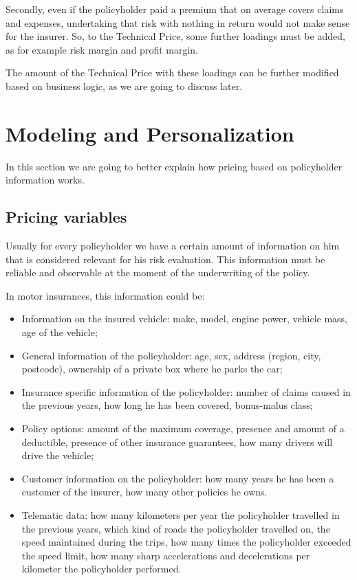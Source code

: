 \documentclass[a4paper, twoside, openright, 12pt]{report}
\providecommand{\tightlist}{%
  \setlength{\itemsep}{0pt}\setlength{\parskip}{0pt}}
\theoremstyle{definition}
\theoremstyle{definition}
\theoremstyle{definition}
\theoremstyle{remark}
\begin{document}
Secondly, even if the policyholder paid a premium that on average covers claims and expenses, undertaking that risk with nothing in return would not make sense for the insurer. So, to the Technical Price, some further loadings must be added, as for example risk margin and profit margin.

The amount of the Technical Price with these loadings can be further modified based on business logic, as we are going to discuss later.

\hypertarget{chap:personalization}{%
\section{Modeling and Personalization}\label{chap:personalization}}

In this section we are going to better explain how pricing based on policyholder information works.

\hypertarget{chap:pricing-variables}{%
\subsection{Pricing variables}\label{chap:pricing-variables}}

Usually for every policyholder we have a certain amount of information on him that is considered relevant for his risk evaluation. This information must be reliable and observable at the moment of the underwriting of the policy.

In motor insurances, this information could be:

\begin{itemize}
\tightlist
\item
  Information on the insured vehicle: make, model, engine power, vehicle mass, age of the vehicle;
\item
  General information of the policyholder: age, sex, address (region, city, postcode), ownership of a private box where he parks the car;
\item
  Insurance specific information of the policyholder: number of claims caused in the previous years, how long he has been covered, bonus-malus class;
\item
  Policy options: amount of the maximum coverage, presence and amount of a deductible, presence of other insurance guarantees, how many drivers will drive the vehicle;
\item
  Customer information on the policyholder: how many years he has been a customer of the insurer, how many other policies he owns.
\item
  Telematic data: how many kilometers per year the policyholder travelled in the previous years, which kind of roads the policyholder travelled on, the speed maintained during the trips, how many times the policyholder exceeded the speed limit, how many sharp accelerations and decelerations per kilometer the policyholder performed.
\end{itemize}
\end{document}
